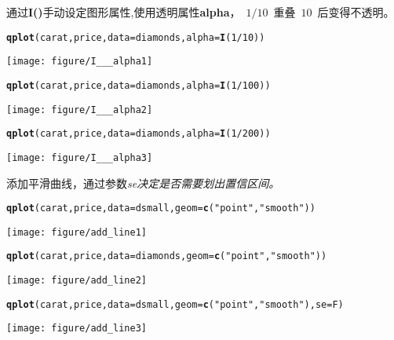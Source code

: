\documentclass{article}\usepackage[]{graphicx}\usepackage[]{color}
\makeatletter
\def\maxwidth{ %
  \ifdim\Gin@nat@width>\linewidth
    \linewidth
  \else
    \Gin@nat@width
  \fi
}
\newcommand{\hlnum}[1]{\textcolor[rgb]{0.686,0.059,0.569}{#1}}%
\newcommand{\hlstr}[1]{\textcolor[rgb]{0.192,0.494,0.8}{#1}}%
\newcommand{\hlopt}[1]{\textcolor[rgb]{0,0,0}{#1}}%
\newcommand{\hlstd}[1]{\textcolor[rgb]{0.345,0.345,0.345}{#1}}%
\newcommand{\hlkwc}[1]{\textcolor[rgb]{0.333,0.667,0.333}{#1}}%
\newcommand{\hlkwd}[1]{\textcolor[rgb]{0.737,0.353,0.396}{\textbf{#1}}}%
\newenvironment{kframe}{%
 \def\at@end@of@kframe{}%
 \ifinner\ifhmode%
  \def\at@end@of@kframe{\end{minipage}}%
  \begin{minipage}{\columnwidth}%
 \fi\fi%
 \def\FrameCommand##1{\hskip\@totalleftmargin \hskip-\fboxsep
 \colorbox{shadecolor}{##1}\hskip-\fboxsep
     \hskip-\linewidth \hskip-\@totalleftmargin \hskip\columnwidth}%
 \MakeFramed {\advance\hsize-\width
   \@totalleftmargin\z@ \linewidth\hsize
   \@setminipage}}%
 {\par\unskip\endMakeFramed%
 \at@end@of@kframe}
\newenvironment{knitrout}{}{} %
\makeatother
\begin{document}
\begin{CJK*}{UTF8}{gkai}
\begin{knitrout}
\end{knitrout}
通过\textbf{I()}手动设定图形属性,使用透明属性\textbf{alpha}，~$1/10$~重叠~$10$~后变得不透明。
\begin{knitrout}
\color{fgcolor}\begin{kframe}
\begin{alltt}
\hlkwd{qplot}\hlstd{(carat, price,} \hlkwc{data} \hlstd{= diamonds,} \hlkwc{alpha} \hlstd{=} \hlkwd{I}\hlstd{(}\hlnum{1}\hlopt{/}\hlnum{10}\hlstd{))}
\end{alltt}
\end{kframe}
\texttt{[image: figure/I\_\_\_alpha1]} 
\begin{kframe}\begin{alltt}
\hlkwd{qplot}\hlstd{(carat, price,} \hlkwc{data} \hlstd{= diamonds,} \hlkwc{alpha} \hlstd{=} \hlkwd{I}\hlstd{(}\hlnum{1}\hlopt{/}\hlnum{100}\hlstd{))}
\end{alltt}
\end{kframe}
\texttt{[image: figure/I\_\_\_alpha2]} 
\begin{kframe}\begin{alltt}
\hlkwd{qplot}\hlstd{(carat, price,} \hlkwc{data} \hlstd{= diamonds,} \hlkwc{alpha} \hlstd{=} \hlkwd{I}\hlstd{(}\hlnum{1}\hlopt{/}\hlnum{200}\hlstd{))}
\end{alltt}
\end{kframe}
\texttt{[image: figure/I\_\_\_alpha3]} 

\end{knitrout}
添加平滑曲线，通过参数\em{se}决定是否需要划出置信区间。
\begin{knitrout}
\color{fgcolor}\begin{kframe}
\begin{alltt}
\hlkwd{qplot}\hlstd{(carat, price,} \hlkwc{data} \hlstd{= dsmall,} \hlkwc{geom} \hlstd{=} \hlkwd{c}\hlstd{(}\hlstr{"point"}\hlstd{,} \hlstr{"smooth"}\hlstd{))}
\end{alltt}
\end{kframe}
\texttt{[image: figure/add\_line1]} 
\begin{kframe}\begin{alltt}
\hlkwd{qplot}\hlstd{(carat, price,} \hlkwc{data} \hlstd{= diamonds,} \hlkwc{geom} \hlstd{=} \hlkwd{c}\hlstd{(}\hlstr{"point"}\hlstd{,} \hlstr{"smooth"}\hlstd{))}
\end{alltt}
\end{kframe}
\texttt{[image: figure/add\_line2]} 
\begin{kframe}\begin{alltt}
\hlkwd{qplot}\hlstd{(carat, price,} \hlkwc{data} \hlstd{= dsmall,} \hlkwc{geom} \hlstd{=} \hlkwd{c}\hlstd{(}\hlstr{"point"}\hlstd{,} \hlstr{"smooth"}\hlstd{),} \hlkwc{se} \hlstd{= F)}
\end{alltt}
\end{kframe}
\texttt{[image: figure/add\_line3]} 


\end{knitrout}
\end{CJK*}
\end{document}
